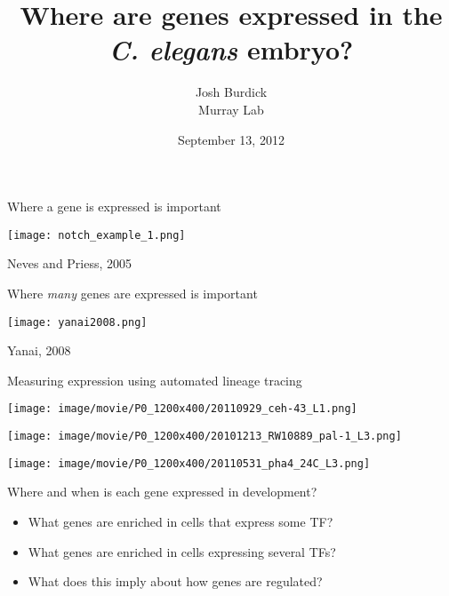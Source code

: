 \documentclass[serif,9pt]{beamer}
\title{Where are genes expressed in the {\em C. elegans} embryo?}
\author{Josh Burdick \\ Murray Lab}
\date{September 13, 2012}
\begin{document}
\begin{frame}
\titlepage
\end{frame}

\begin{frame}{Where a gene is expressed is important}

\begin{centering}
\texttt{[image: notch\_example\_1.png]}
\end{centering}

\hfill Neves and Priess, 2005

\end{frame}

\begin{frame}{Where {\em many} genes are expressed is important}

\texttt{[image: yanai2008.png]}

\hfill Yanai, 2008

\end{frame}

\begin{frame}{Measuring expression using automated lineage tracing}

{\center
\texttt{[image: image/movie/P0\_1200x400/20110929\_ceh-43\_L1.png]}

\texttt{[image: image/movie/P0\_1200x400/20101213\_RW10889\_pal-1\_L3.png]}

\texttt{[image: image/movie/P0\_1200x400/20110531\_pha4\_24C\_L3.png]}
}

\end{frame}

\begin{frame}{Where and when is each gene expressed in development?}

\begin{itemize}

\item What genes are enriched in cells that express some TF?

\pause 

\item What genes are enriched in cells expressing several TFs?

\pause

\item What does this imply about how genes are regulated?

\end{itemize}

\end{frame}
\end{document}
